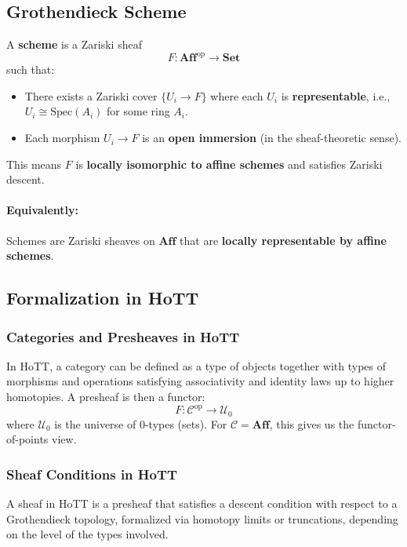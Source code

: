 \documentclass{article}
\begin{document}
\subsection{Grothendieck Scheme}

A \textbf{scheme} is a Zariski sheaf
\[
F : \mathbf{Aff}^{\mathrm{op}} \to \mathbf{Set}
\]
such that:

\begin{itemize}
  \item There exists a Zariski cover $\{ U_i \to F \}$ where each $U_i$ is \textbf{representable}, i.e., $U_i \cong \mathrm{Spec}(A_i)$ for some ring $A_i$.
  \item Each morphism $U_i \to F$ is an \textbf{open immersion} (in the sheaf-theoretic sense).
\end{itemize}

This means $F$ is \textbf{locally isomorphic to affine schemes} and satisfies Zariski descent.

\paragraph{Equivalently:} Schemes are Zariski sheaves on $\mathbf{Aff}$ that are \textbf{locally representable by affine schemes}.

\subsection{Formalization in HoTT}

\subsubsection*{Categories and Presheaves in HoTT}

In HoTT, a category can be defined as a type of objects together with types of morphisms and operations satisfying associativity and identity laws up to higher homotopies. A presheaf is then a functor:
\[
F : \mathcal{C}^{\mathrm{op}} \to \mathcal{U}_0
\]
where $\mathcal{U}_0$ is the universe of $0$-types (sets). For $\mathcal{C} = \mathbf{Aff}$, this gives us the functor-of-points view.

\subsubsection*{Sheaf Conditions in HoTT}

A sheaf in HoTT is a presheaf that satisfies a descent condition with respect to a Grothendieck topology, formalized via homotopy limits or truncations, depending on the level of the types involved.
\end{document}
